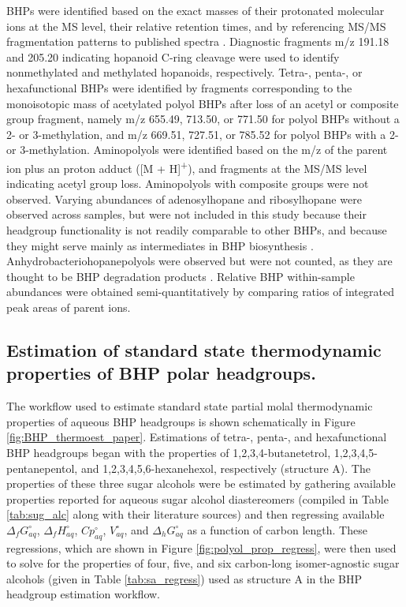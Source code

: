 BHPs were identified based on the exact masses of their protonated molecular ions at the MS level, their relative retention times, and by referencing MS/MS fragmentation patterns to published spectra \citep{talbot2005bacteriohopanepolyols, talbot2007rapid, talbot2007structural, talbot2003atmospheric, talbot2003characteristic, talbot2008cyanobacterial}. Diagnostic fragments m/z 191.18 and 205.20 indicating hopanoid C-ring cleavage were used to identify nonmethylated and methylated hopanoids, respectively. Tetra-, penta-, or hexafunctional BHPs were identified by fragments corresponding to the monoisotopic mass of acetylated polyol BHPs after loss of an acetyl or composite group fragment, namely m/z 655.49, 713.50, or 771.50 for polyol BHPs without a 2- or 3-methylation, and m/z 669.51, 727.51, or 785.52 for polyol BHPs with a 2- or 3-methylation. Aminopolyols were identified based on the m/z of the parent ion plus an proton adduct ([M + H]\textsuperscript{+}), and fragments at the MS/MS level indicating acetyl group loss. Aminopolyols with composite groups were not observed. Varying abundances of adenosylhopane and ribosylhopane were observed across samples, but were not included in this study because their headgroup functionality is not readily comparable to other BHPs, and because they might serve mainly as intermediates in BHP biosynthesis \citep{bradley2010adenosylhopane, liu2014ribosylhopane}. Anhydrobacteriohopanepolyols were observed but were not counted, as they are thought to be BHP degradation products \citep{talbot2005bacteriohopanepolyols, schaeffer2008acid}. Relative BHP within-sample abundances were obtained semi-quantitatively by comparing ratios of integrated peak areas of parent ions.



\subsection{Estimation of standard state thermodynamic properties of BHP polar headgroups.}
The workflow used to estimate standard state partial molal thermodynamic properties of aqueous BHP headgroups is shown schematically in Figure \ref{fig:BHP_thermoest_paper}. Estimations of tetra-, penta-, and hexafunctional BHP headgroups began with the properties of 1,2,3,4-butanetetrol, 1,2,3,4,5-pentanepentol, and 1,2,3,4,5,6-hexanehexol, respectively (structure A). The properties of these three sugar alcohols were be estimated by gathering available properties reported for aqueous sugar alcohol diastereomers (compiled in Table \ref{tab:sug_alc} along with their literature sources) and then regressing available $\Delta_{f}G^{\circ}_{aq}$, $\Delta_{f}H^{\circ}_{aq}$, $Cp^{\circ}_{aq}$, $V^{\circ}_{aq}$, and $\Delta_{h}G^{\circ}_{aq}$ as a function of carbon length. These regressions, which are shown in Figure \ref{fig:polyol_prop_regress}, were then used to solve for the properties of four, five, and six carbon-long isomer-agnostic sugar alcohols (given in Table \ref{tab:sa_regress}) used as structure A in the BHP headgroup estimation workflow.


